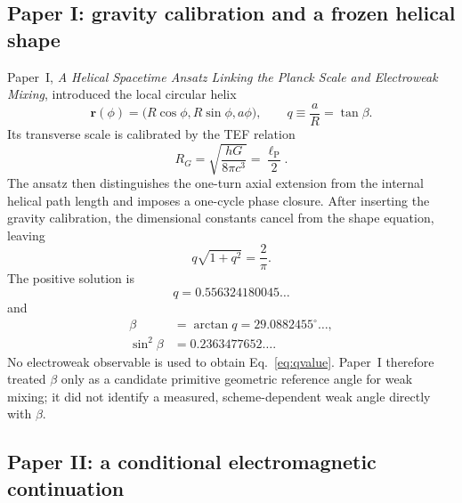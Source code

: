 \documentclass[10pt,twocolumn]{article}
\newcommand{\qval}{0.556324180045}
\begin{document}
\subsection{Paper I: gravity calibration and a frozen helical shape}

Paper~I, \emph{A Helical Spacetime Ansatz Linking the Planck Scale and
Electroweak Mixing}, introduced the local circular helix~\cite{WuI}
\begin{equation}
\bm r(\phi)
=
\bigl(R\cos\phi,R\sin\phi,a\phi\bigr),
\qquad
q\equiv\frac{a}{R}=\tan\beta.
\label{eq:helix}
\end{equation}
Its transverse scale is calibrated by the TEF relation
\begin{equation}
R_G
=
\sqrt{\frac{hG}{8\pi c^3}}
=
\frac{\ell_{\mathrm P}}{2}.
\label{eq:RG}
\end{equation}
The ansatz then distinguishes the one-turn axial extension from the internal
helical path length and imposes a one-cycle phase closure.  After inserting the
gravity calibration, the dimensional constants cancel from the shape equation,
leaving
\begin{equation}
q\sqrt{1+q^2}
=
\frac{2}{\pi}.
\label{eq:qconstraint}
\end{equation}
The positive solution is
\begin{equation}
\boxed{
q=\qval\ldots
}
\label{eq:qvalue}
\end{equation}
and
\begin{align}
\beta
&=\arctan q=29.0882455^{\circ}\ldots,\\
\sin^2\beta
&=0.2363477652\ldots .
\end{align}
No electroweak observable is used to obtain Eq.~\eqref{eq:qvalue}.
Paper~I therefore treated $\beta$ only as a candidate primitive geometric
reference angle for weak mixing; it did not identify a measured, scheme-dependent
weak angle directly with $\beta$.

\subsection{Paper II: a conditional electromagnetic continuation}
\end{document}

